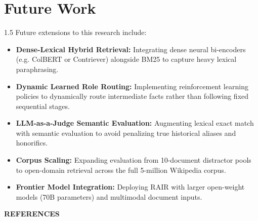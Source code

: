 \documentclass[12pt,a4paper]{report}
\begin{document}
\section{Future Work}
\begin{spacing}{1.5}
Future extensions to this research include:
\begin{itemize}
    \item \textbf{Dense-Lexical Hybrid Retrieval:} Integrating dense neural bi-encoders (e.g. ColBERT or Contriever) alongside BM25 to capture heavy lexical paraphrasing.
    \item \textbf{Dynamic Learned Role Routing:} Implementing reinforcement learning policies to dynamically route intermediate facts rather than following fixed sequential stages.
    \item \textbf{LLM-as-a-Judge Semantic Evaluation:} Augmenting lexical exact match with semantic evaluation to avoid penalizing true historical aliases and honorifics.
    \item \textbf{Corpus Scaling:} Expanding evaluation from 10-document distractor pools to open-domain retrieval across the full 5-million Wikipedia corpus.
    \item \textbf{Frontier Model Integration:} Deploying RAIR with larger open-weight models (70B parameters) and multimodal document inputs.
\end{itemize}
\end{spacing}

\clearpage
{}

\begin{center}
{\fontsize{16}{20}\selectfont \bfseries REFERENCES}
\end{center}

\vspace{4\baselineskip}
\end{document}
